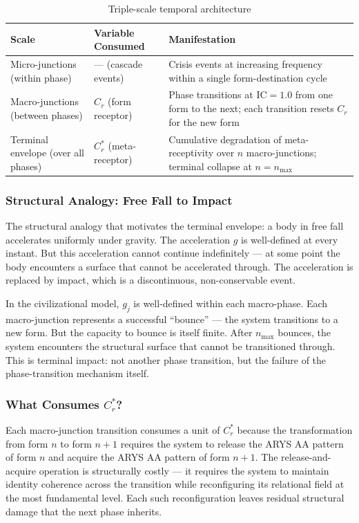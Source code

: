\documentclass[12pt,a4paper]{article}
\newcommand{\reag}{C_r}
\newcommand{\reagmeta}{C_r^{*}}
\newcommand{\gj}{g_j}
\newcommand{\IC}{\mathrm{IC}}
\newcommand{\nmax}{n_{\mathrm{max}}}
\begin{document}
\begin{table}[H]
\centering
\caption{Triple-scale temporal architecture}
\label{tab:triple_scale}
\begin{tabular}{@{}p{2.5cm}p{4cm}p{6cm}@{}}
\toprule
\textbf{Scale} & \textbf{Variable Consumed} & \textbf{Manifestation} \\
\midrule
Micro-junctions (within phase) & --- (cascade events) & Crisis events at increasing frequency within a single form-destination cycle \\[0.4em]
Macro-junctions (between phases) & $\reag$ (form receptor) & Phase transitions at $\IC = 1.0$ from one form to the next; each transition resets $\reag$ for the new form \\[0.4em]
Terminal envelope (over all phases) & $\reagmeta$ (meta-receptor) & Cumulative degradation of meta-receptivity over $n$ macro-junctions; terminal collapse at $n = \nmax$ \\
\bottomrule
\end{tabular}
\end{table}

\subsubsection{Structural Analogy: Free Fall to Impact}

The structural analogy that motivates the terminal envelope: a body in free fall accelerates uniformly under gravity. The acceleration $g$ is well-defined at every instant. But this acceleration cannot continue indefinitely --- at some point the body encounters a surface that cannot be accelerated through. The acceleration is replaced by impact, which is a discontinuous, non-conservable event.

In the civilizational model, $\gj$ is well-defined within each macro-phase. Each macro-junction represents a successful ``bounce'' --- the system transitions to a new form. But the capacity to bounce is itself finite. After $\nmax$ bounces, the system encounters the structural surface that cannot be transitioned through. This is terminal impact: not another phase transition, but the failure of the phase-transition mechanism itself.

\subsubsection{What Consumes $\reagmeta$?}

Each macro-junction transition consumes a unit of $\reagmeta$ because the transformation from form $n$ to form $n+1$ requires the system to release the ARYS AA pattern of form $n$ and acquire the ARYS AA pattern of form $n+1$. The release-and-acquire operation is structurally costly --- it requires the system to maintain identity coherence across the transition while reconfiguring its relational field at the most fundamental level. Each such reconfiguration leaves residual structural damage that the next phase inherits.
\end{document}

